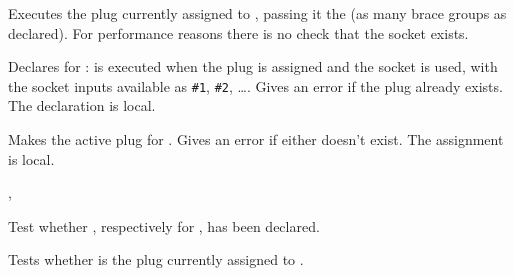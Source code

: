 \documentclass{l3in2edoc}
\begin{document}
\begin{function}[]
  {
    \UseSocket
  }
  \begin{syntax}
      
  \end{syntax}
  Executes the plug currently assigned to , passing it
  the  (as many brace groups as declared). For
  performance reasons there is no check that the socket exists.
\end{function}




\begin{function}[]
  {
    \NewSocketPlug
  }
  \begin{syntax}
         
  \end{syntax}
  Declares  for :  is executed when
  the plug is assigned and the socket is used, with the socket inputs
  available as \texttt{\#1}, \texttt{\#2}, \ldots. Gives an error if
  the plug already exists. The declaration is local.
\end{function}




\begin{function}[user]
  {
    \AssignSocketPlug
  }
  \begin{syntax}
      
  \end{syntax}
  Makes  the active plug for . Gives an error
  if either doesn't exist. The assignment is local.
\end{function}





\begin{function}
  {
    \IfSocketExists,
    \IfSocketPlugExists
  }
  \begin{syntax}
       
        
  \end{syntax}
  Test whether , respectively  for
  , has been declared.
\end{function}





\begin{function}
  {
    \IfSocketPlugAssigned
  }
  \begin{syntax}
        
  \end{syntax}
  Tests whether  is the plug currently assigned to
  .
\end{function}
\end{document}
